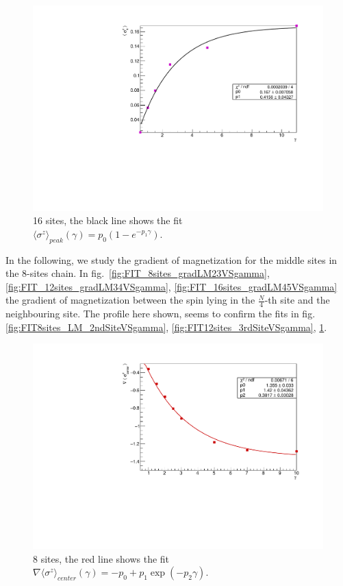 \begin{figure}[H]
    \centering
    \includegraphics[scale=0.7]{Figures/16sites/FIT_16sites_4thSiteVSgamma.pdf}
    \caption{16 sites, the black line shows the fit \\$\langle\sigma^z\rangle_{peak}(\gamma) = p_0(1-e^{-p_1\gamma})$.}
    \label{fig:FIT_16sites_4thSiteVSgamma}
\end{figure}

In the following, we study the gradient of magnetization for the middle sites in the 8-sites chain. In fig.~\ref{fig:FIT_8sites_gradLM23VSgamma}, \ref{fig:FIT_12sites_gradLM34VSgamma}, \ref{fig:FIT_16sites_gradLM45VSgamma} the gradient of magnetization between the spin lying in the $\frac{N}{4}$-th site and the neighbouring site. The profile here shown, seems to confirm the fits in fig.\ref{fig:FIT8sites_LM_2ndSiteVSgamma}, \ref{fig:FIT12sites_3rdSiteVSgamma}, \ref{fig:FIT_16sites_4thSiteVSgamma}.

\begin{figure}[H]
    \centering
    \includegraphics[scale=0.7]{Figures/8sites/FIT_8sites_gradLMcenterVSgamma.pdf}
    \caption{8 sites, the red line shows the fit \\$\nabla \langle\sigma^z\rangle_{center}(\gamma) = -p_0+p_1\exp{(-p_2\gamma)}$.}
    \label{fig:FIT_8sites_gradLMcenterVSgamma}
\end{figure}

